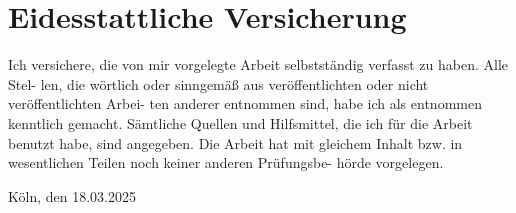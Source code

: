 \clearpage
\thispagestyle{empty}
\section*{Eidesstattliche Versicherung}
\label{sec:SOOA}

\vspace{2.5cm}

Ich versichere, die von mir vorgelegte Arbeit selbstständig verfasst zu haben. Alle Stel-
len, die wörtlich oder sinngemäß aus veröffentlichten oder nicht veröffentlichten Arbei-
ten anderer entnommen sind, habe ich als entnommen kenntlich gemacht. Sämtliche
Quellen und Hilfsmittel, die ich für die Arbeit benutzt habe, sind angegeben. Die Arbeit
hat mit gleichem Inhalt bzw. in wesentlichen Teilen noch keiner anderen Prüfungsbe-
hörde vorgelegen.

\vspace{1cm}
\noindent
\textbf{\thesisauthor{}}

\vspace{0.5cm}
\noindent
Köln, den 18.03.2025
